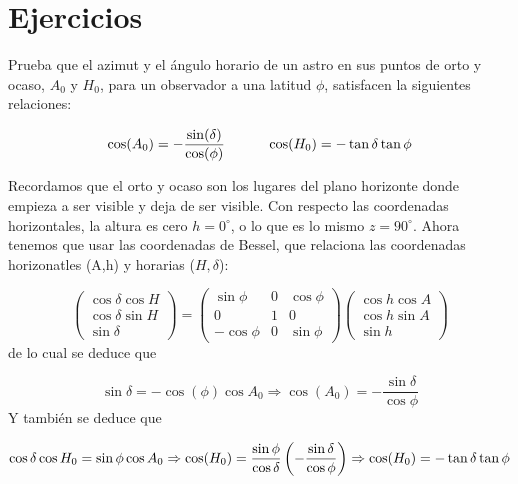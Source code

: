 
\section{Ejercicios}


\tcbstartrecording
\begin{texercise}
	
	Prueba que el azimut y el ángulo horario de un astro en sus puntos de orto y ocaso, $A_0$ y $H_0$, para un observador a una latitud $\phi$, satisfacen la siguientes relaciones:
	
	\begin{equation}
		\cos (A_0) = - \frac{\sin (\delta)}{\cos (\phi)} \quad \quad \quad \cos (H_0) = - \tan \delta \tan \phi
	\end{equation}
	\tcblower

	Recordamos que el orto y ocaso son los lugares del plano horizonte donde empieza a ser visible y deja de ser visible. Con respecto las coordenadas horizontales, la altura es cero $h=0^\circ$, o lo que es lo mismo $z=90^\circ$. Ahora tenemos que usar las coordenadas de Bessel, que relaciona las coordenadas horizonatles (A,h) y horarias ($H,\delta$):
	
	\begin{equation}
	\begin{pmatrix}
		\cos \delta \cos H \\
		\cos \delta \sin H \\
		\sin \delta 
	\end{pmatrix} =\begin{pmatrix}
		\sin \phi & 0 & \cos \phi \\
		0 & 1 & 0 \\
		- \cos \phi & 0 & \sin \phi
	\end{pmatrix}
	\begin{pmatrix}
		\cos h \cos A \\
		\cos h \sin A \\
		\sin h
	\end{pmatrix}
	\end{equation}
	de lo cual se deduce que
	
	\begin{equation}
	\sin \delta = - \cos (\phi) \cos A_0  \Rightarrow \cos (A_0) = - \frac{\sin \delta}{\cos \phi}
	\end{equation}
	Y también se deduce que
	
	\begin{equation}
	\cos \delta \cos H_0 = \sin \phi \cos A_0 \Rightarrow \cos (H_0) = \frac{\sin \phi}{\cos \delta} \left(  - \frac{\sin \delta}{\cos \phi} \right) \Rightarrow \cos (H_0) = - \tan \delta \tan \phi
	\end{equation}
\end{texercise}

